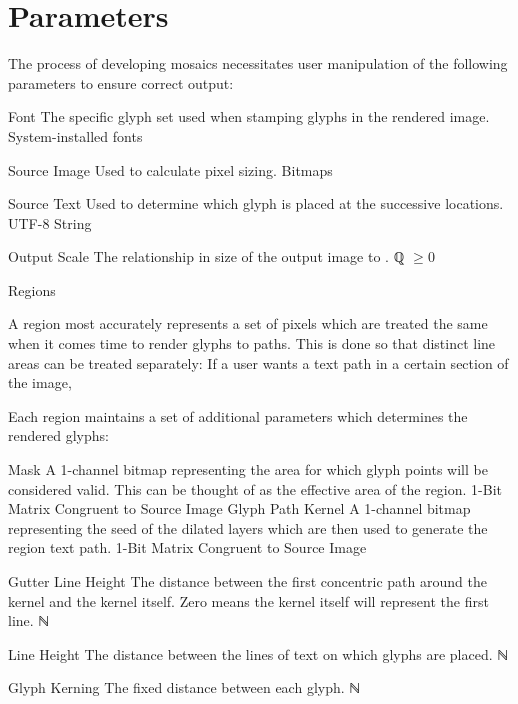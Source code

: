 \section{Parameters}
\label{apx:userparams}
The process of developing mosaics necessitates user manipulation of the following parameters to ensure correct output:
\begin{itemize}
  \paritem
  {Font}
  {The specific glyph set used when stamping glyphs in the rendered image.  }
  {System-installed fonts}
  {\FontParSymbol}

  \paritem
  {Source Image}
  {Used to calculate pixel sizing.}
  {Bitmaps}
  {\SrcImgParSymbol}

  \paritem
  {Source Text}
  {Used to determine which glyph is placed at the successive locations.}
  {UTF-8 String}
  {\SrcTxtParSymbol}

  \paritem
  {Output Scale}
  {The relationship in size of the output image to \SrcImgParSymbol.}
  {ℚ \(\geq 0\)}
  {\OutSclParSymbol}

  \pbodyitem
  {Regions}
  {
    A region most accurately represents a set of pixels which are treated the same when it comes time to render glyphs to paths.
    This is done so that distinct line areas can be treated separately:  If a user wants a text path in a certain section of the image,

    Each region maintains a set of additional parameters which determines the rendered glyphs:
    \begin{itemize}
      \paritem
      {Mask}
      {A 1-channel bitmap representing the area for which glyph points will be considered valid.
        This can be thought of as the effective area of the region.}
      {1-Bit Matrix Congruent to Source Image}
      {\RegMskParSymbol}
      \paritem
      {Glyph Path Kernel}
      {A 1-channel bitmap representing the seed of the dilated layers which are then used to generate the region text path.}
      {1-Bit Matrix Congruent to Source Image}
      {\GlyphPathKernelParSymbol}

      \paritem
      {Gutter Line Height}
      {The distance between the first concentric path around the kernel and the kernel itself.
        Zero means the kernel itself will represent the first line.}
      {ℕ}
      {\GtrHtParSymbol}

      \paritem
      {Line Height}
      {The distance between the lines of text on which glyphs are placed.}
      {ℕ}
      {\LnHtParSymbol}

      \paritem
      {Glyph Kerning}
      {The fixed distance between each glyph.}
      {ℕ}
      {\GlyphKrnParSymbol}


\end{itemize}}
\end{itemize}
